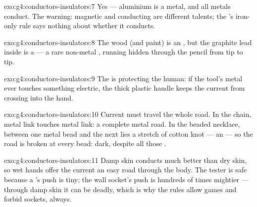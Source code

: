\begin{solution}{exo:g4:conductors-insulators:7}
Yes --- aluminium is a metal, and all metals conduct. The warning:
magnetic and conducting are different talents; the 's
iron-only rule says nothing about whether it conducts.
\end{solution}

\begin{solution}{exo:g4:conductors-insulators:8}
The wood (and paint) is an , but the graphite lead inside
is a  --- a rare non-metal ,
running hidden through the pencil from tip to tip.
\end{solution}

\begin{solution}{exo:g4:conductors-insulators:9}
The  is protecting the human: if the tool's metal
ever touches something electric, the thick plastic handle keeps the
current from crossing into the hand.
\end{solution}

\begin{solution}{exo:g4:conductors-insulators:10}
Current must travel the whole road. In the chain, metal link touches
metal link: a complete metal road. In the beaded necklace, between
one metal bead and the next lies a stretch of cotton knot --- an
 --- so the road is broken at every bead: dark, despite all
those .
\end{solution}

\begin{solution}{exo:g4:conductors-insulators:11}
Damp skin conducts much better than dry skin, so wet hands offer
the current an easy road through the body. The  tester is
safe because a 's push is tiny; the wall socket's push is
hundreds of times mightier --- through damp skin it can be deadly,
which is why the rules allow  games and forbid sockets,
always.
\end{solution}
